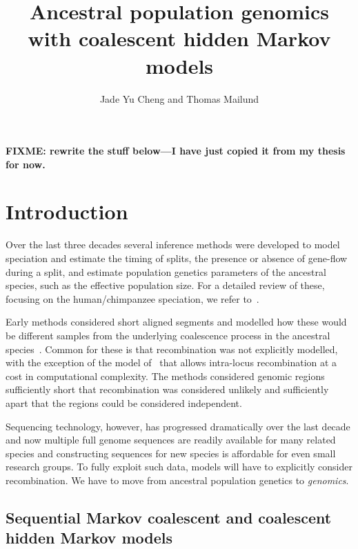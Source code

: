 \documentclass[graybox]{svmult}
\begin{document}
\title*{Ancestral population genomics with coalescent hidden Markov models}
\author{Jade Yu Cheng and Thomas Mailund}
\maketitle


\textbf{FIXME: rewrite the stuff below---I have just copied it from my thesis for now.}

\section{Introduction}

Over the last three decades several inference methods were developed to model speciation and estimate the timing of splits, the presence or absence of gene-flow during a split, and estimate population genetics parameters of the ancestral species, such as the effective population size. For a detailed review of these, focusing on the human/chimpanzee speciation, we refer to~\citet{Mailund:2014fyb}.

Early methods considered short aligned segments and modelled how these would be different samples from the underlying coalescence process in the ancestral species~\cite{Takahata1995Divergence-time,Innan2006The-effect-of-g,Burgess2008Estimation-of-h,Rannala2003,Yang2010,Yang2006,Yang2002,Becquet:2009ht,Wu:2004ib,Chen:2001dk,Wall2003}. Common for these is that recombination was not explicitly modelled, with the exception of the model of~\citet{Becquet2007A-new-approach-} that allows intra-locus recombination at a cost in computational complexity. The methods considered genomic regions sufficiently short that recombination was considered unlikely and sufficiently apart that the regions could be considered independent.

Sequencing technology, however, has progressed dramatically over the last decade and now multiple full genome sequences are readily available for many related species and constructing sequences for new species is affordable for even small research groups. To fully exploit such data, models will have to explicitly consider recombination. We have to move from ancestral population genetics to \emph{genomics}.


\subsection{Sequential Markov coalescent and coalescent hidden Markov models}
\end{document}
